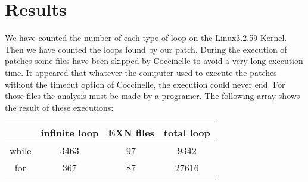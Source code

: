 \documentclass[11pt]{article}
\begin{document}
\vspace*{5mm}

\lstset{numbers=left,firstnumber=1,numberfirstline=true}
\begin{lstlisting}[language=C]

\end{lstlisting}

\section{Results}
We have counted the number of each type of loop on the Linux3.2.59 Kernel. Then we have counted the loops found by our patch. During the execution of patches some files have been skipped by Coccinelle to avoid a very long execution time. It appeared that whatever the computer used to execute the patches without the timeout option of Coccinelle, the execution could never end. For those files the analysis must be made by a programer. The following array shows the result of these executions:

\vspace*{5mm}
\begin{tabular}{|c|c|c|c|}
  \hline
    & infinite loop & EXN files & total loop \\
  \hline
  while &  3463  & 97 & 9342 \\
  \hline
  for  & 367 & 87 &  27616 \\
  \hline
\end{tabular} 
\vspace*{5mm}
\end{document}
